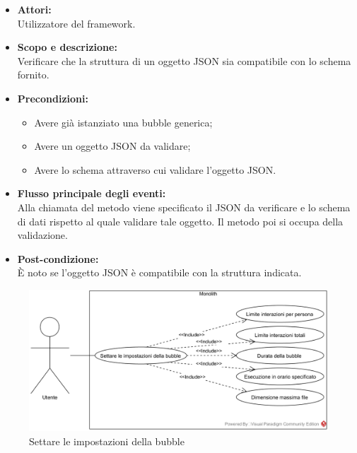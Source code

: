 \begin{itemize}
	\item \textbf{Attori:}
	\\Utilizzatore del framework.
	\item \textbf{Scopo e descrizione:} 
	\\Verificare che la struttura di un oggetto JSON sia compatibile con lo schema fornito.
	\item \textbf{Precondizioni:}
	\begin{itemize}
		\item Avere già istanziato una bubble generica;
		\item Avere un oggetto JSON da validare;
		\item Avere lo schema attraverso cui validare l'oggetto JSON.
	\end{itemize}
	\item \textbf{Flusso principale degli eventi:}
	\\Alla chiamata del metodo viene specificato il JSON da verificare e lo schema di dati rispetto al quale validare tale oggetto. Il metodo poi si occupa della validazione.
	\item \textbf{Post-condizione:}
	\\È noto se l'oggetto JSON è compatibile con la struttura indicata.
\end{itemize}

\begin{figure}[H]
	\centering
	\includegraphics[width=15cm]{../../documenti/AnalisiDeiRequisiti/Diagrammi_img/Impostazioni.png}
	\caption{\UCCaption{} Settare le impostazioni della bubble}
\end{figure}

